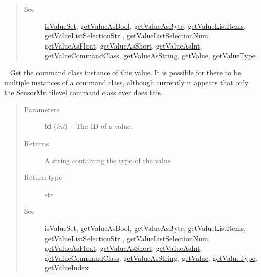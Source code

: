 \documentclass[letterpaper,10pt,english]{sphinxmanual}
\begin{document}
\begin{fulllineitems}
\begin{fulllineitems}
\begin{quote}
\begin{description}
\item[{See}] \leavevmode
{\hyperref[libopenzwave:isvalueset]{isValueSet}}, {\hyperref[libopenzwave:getvalueasbool]{getValueAsBool}}, {\hyperref[libopenzwave:getvalueasbyte]{getValueAsByte}}, {\hyperref[libopenzwave:getvaluelistitems]{getValueListItems}}, {\hyperref[libopenzwave:getvaluelistselectionstr]{getValueListSelectionStr}} , {\hyperref[libopenzwave:getvaluelistselectionnum]{getValueListSelectionNum}}, {\hyperref[libopenzwave:getvalueasfloat]{getValueAsFloat}}, {\hyperref[libopenzwave:getvalueasshort]{getValueAsShort}}, {\hyperref[libopenzwave:getvalueasint]{getValueAsInt}}, {\hyperref[libopenzwave:getvaluecommandclass]{getValueCommandClass}}, {\hyperref[libopenzwave:getvalueasstring]{getValueAsString}}, {\hyperref[libopenzwave:getvalue]{getValue}}, {\hyperref[libopenzwave:getvaluetype]{getValueType}}

\end{description}\end{quote}

\end{fulllineitems}


\begin{fulllineitems}
\label{libopenzwave:libopenzwave.PyManager.getValueInstance}~\label{libopenzwave:getvalueinstance}
Get the command class instance of this value.  It is possible for there to be
multiple instances of a command class, although currently it appears that
only the SensorMultilevel command class ever does this.
\begin{quote}\begin{description}
\item[{Parameters}] \leavevmode
\textbf{id} (\emph{int}) -- The ID of a value.

\item[{Returns}] \leavevmode
A string containing the type of the value

\item[{Return type}] \leavevmode
str

\item[{See}] \leavevmode
{\hyperref[libopenzwave:isvalueset]{isValueSet}}, {\hyperref[libopenzwave:getvalueasbool]{getValueAsBool}}, {\hyperref[libopenzwave:getvalueasbyte]{getValueAsByte}}, {\hyperref[libopenzwave:getvaluelistitems]{getValueListItems}}, {\hyperref[libopenzwave:getvaluelistselectionstr]{getValueListSelectionStr}} , {\hyperref[libopenzwave:getvaluelistselectionnum]{getValueListSelectionNum}}, {\hyperref[libopenzwave:getvalueasfloat]{getValueAsFloat}}, {\hyperref[libopenzwave:getvalueasshort]{getValueAsShort}}, {\hyperref[libopenzwave:getvalueasint]{getValueAsInt}}, {\hyperref[libopenzwave:getvaluecommandclass]{getValueCommandClass}}, {\hyperref[libopenzwave:getvalueasstring]{getValueAsString}}, {\hyperref[libopenzwave:getvalue]{getValue}}, {\hyperref[libopenzwave:getvaluetype]{getValueType}}, {\hyperref[libopenzwave:getvalueindex]{getValueIndex}}


\end{description}
\end{quote}
\end{fulllineitems}
\end{fulllineitems}
\end{document}
